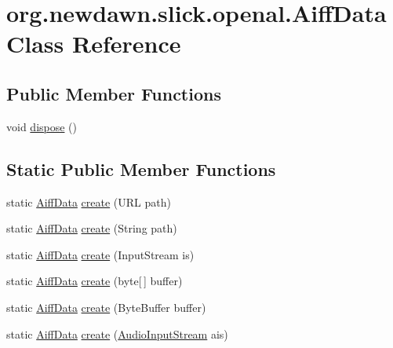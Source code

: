 \hypertarget{classorg_1_1newdawn_1_1slick_1_1openal_1_1_aiff_data}{}\section{org.\+newdawn.\+slick.\+openal.\+Aiff\+Data Class Reference}
\label{classorg_1_1newdawn_1_1slick_1_1openal_1_1_aiff_data}
\subsection*{Public Member Functions}
\begin{DoxyCompactItemize}
\item 
void \mbox{\hyperlink{classorg_1_1newdawn_1_1slick_1_1openal_1_1_aiff_data_af575f6fa8e4c93a2a3c2820974e48371}{dispose}} ()
\end{DoxyCompactItemize}
\subsection*{Static Public Member Functions}
\begin{DoxyCompactItemize}
\item 
static \mbox{\hyperlink{classorg_1_1newdawn_1_1slick_1_1openal_1_1_aiff_data}{Aiff\+Data}} \mbox{\hyperlink{classorg_1_1newdawn_1_1slick_1_1openal_1_1_aiff_data_a0ebd8831d179c446e18751819f9045c5}{create}} (U\+RL path)
\item 
static \mbox{\hyperlink{classorg_1_1newdawn_1_1slick_1_1openal_1_1_aiff_data}{Aiff\+Data}} \mbox{\hyperlink{classorg_1_1newdawn_1_1slick_1_1openal_1_1_aiff_data_a236d4055671a1426b2bdf9908f83f209}{create}} (String path)
\item 
static \mbox{\hyperlink{classorg_1_1newdawn_1_1slick_1_1openal_1_1_aiff_data}{Aiff\+Data}} \mbox{\hyperlink{classorg_1_1newdawn_1_1slick_1_1openal_1_1_aiff_data_aae3dd3637672c9960ead394cc45d074c}{create}} (Input\+Stream is)
\item 
static \mbox{\hyperlink{classorg_1_1newdawn_1_1slick_1_1openal_1_1_aiff_data}{Aiff\+Data}} \mbox{\hyperlink{classorg_1_1newdawn_1_1slick_1_1openal_1_1_aiff_data_a930e114892ff2c908c7e98fa549dfe76}{create}} (byte\mbox{[}$\,$\mbox{]} buffer)
\item 
static \mbox{\hyperlink{classorg_1_1newdawn_1_1slick_1_1openal_1_1_aiff_data}{Aiff\+Data}} \mbox{\hyperlink{classorg_1_1newdawn_1_1slick_1_1openal_1_1_aiff_data_aad2615c92a623df3628a34ff787a659c}{create}} (Byte\+Buffer buffer)
\item 
static \mbox{\hyperlink{classorg_1_1newdawn_1_1slick_1_1openal_1_1_aiff_data}{Aiff\+Data}} \mbox{\hyperlink{classorg_1_1newdawn_1_1slick_1_1openal_1_1_aiff_data_a84f2be2ea444abb6758bc7833b1a5c02}{create}} (\mbox{\hyperlink{interfaceorg_1_1newdawn_1_1slick_1_1openal_1_1_audio_input_stream}{Audio\+Input\+Stream}} ais)
\end{DoxyCompactItemize}
